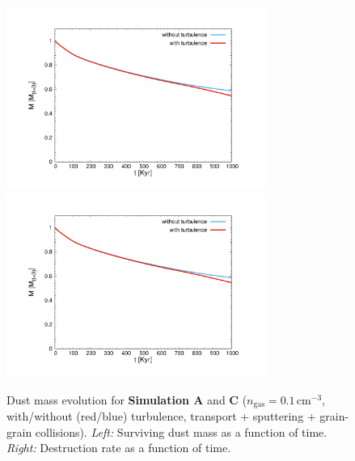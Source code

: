 \documentclass[fleqn,usenatbib]{mnras}
\begin{document}
      \begin{figure}
 \includegraphics[trim=2.5cm 1.5cm 2.2cm 2.3cm, clip=true,page=1,height = 6cm]{Pics/Pics_A2/Evolution_total.pdf}\hspace*{-0.1cm}
 \includegraphics[trim=2.5cm 1.5cm 2.2cm 2.3cm, clip=true,page=1,height = 6cm, page =2]{Pics/Pics_A2/Evolution_total.pdf}\\
  \caption{Dust mass evolution for \textbf{Simulation A} and \textbf{C} ($n_\text{gas}=0.1\,\text{cm}^{-3}$, with/without (red/blue) turbulence, transport + sputtering + grain-grain collisions). \textit{Left:} Surviving dust mass as a function of time. \textit{Right:} Destruction rate as a function of time.}
  \label{fig_A2C2_other}  
  \end{figure}  
  
\end{document}
